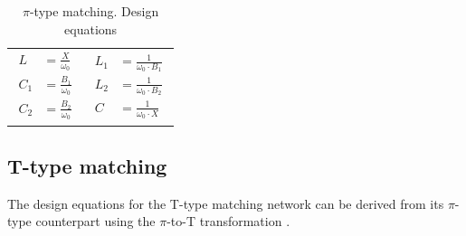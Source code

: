 \begin{table}[H]
\begin{tabular}{ | c | c | }
\begin{minipage}{.4\textwidth}
    \end{minipage}
\\ \hline
    \begin{minipage}{.4\textwidth}
         {\begin{align}
           L &= \frac{X}{\omega_0}\\
           C_1 &= \frac{B_1}{\omega_0}\\
           C_2 &= \frac{B_2}{\omega_0}
         \end{align}}
    \end{minipage}
    &
        \begin{minipage}{.4\textwidth}
         {\begin{align}
           L_1 &= \frac{1}{\omega_0 \cdot B_1}\\
           L_2 &= \frac{1}{\omega_0 \cdot B_2}\\
           C   &= \frac{1}{\omega_0 \cdot X}
         \end{align}}
    \end{minipage}
    \\ \hline
  \end{tabular}
  \caption{$\pi$-type matching. Design equations}
  \label{tbl:pi-type-matching}
\end{table}

\subsection{T-type matching}

\noindent The design equations for the T-type matching network can be derived from its $\pi$-type counterpart using the $\pi$-to-T transformation \cite{ElectricalCommunicationAAlbert}.

